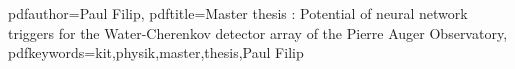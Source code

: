 \newcommand{\thesisentopic}{Potential of neural network triggers for the Water-Cherenkov detector array of the Pierre Auger Observatory}

\newcommand{\thesisinstitute}{Institute for Astroparticle Physics}

\newcommand{\thesisauthor}{Paul Filip}
\newcommand{\thesisreviewerone}{Prof. Dr. Ralph Engel}
\newcommand{\thesisreviewertwo}{Prof. Dr. Guido Drexlin}
\newcommand{\thesissupervisors}{Dr. David Schmidt}

\newcommand{\thesistimestart}{01.04.2022}
\newcommand{\thesistimeend}{02.05.2023}
\newcommand{\thesistimehandin}{02.05.2023}

\hypersetup
{
	pdfauthor={\thesisauthor},
	pdftitle={Master thesis : \thesisentopic},
	pdfkeywords={kit,physik,master,thesis,\thesisauthor}
}
